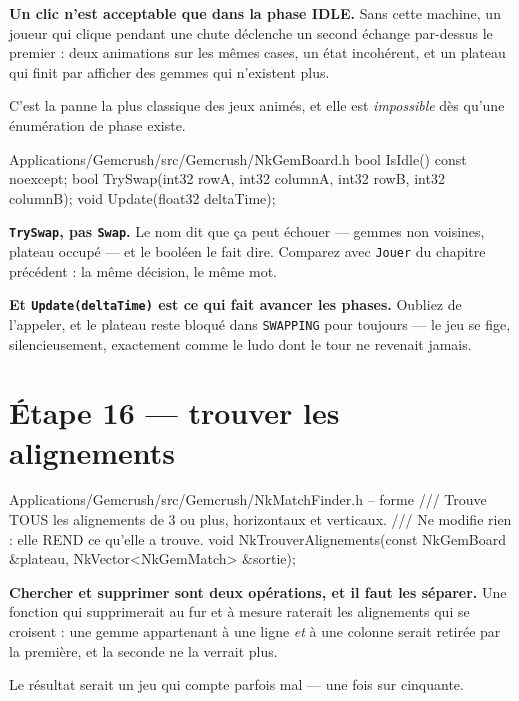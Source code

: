 \begin{nkretenir}
\textbf{Un clic n'est acceptable que dans la phase IDLE.} Sans cette machine, un
joueur qui clique pendant une chute déclenche un second échange par-dessus le
premier : deux animations sur les mêmes cases, un état incohérent, et un plateau
qui finit par afficher des gemmes qui n'existent plus.

C'est la panne la plus classique des jeux animés, et elle est \emph{impossible}
dès qu'une énumération de phase existe.
\end{nkretenir}

\begin{nkcode}{Applications/Gemcrush/src/Gemcrush/NkGemBoard.h}
bool IsIdle() const noexcept;
bool TrySwap(int32 rowA, int32 columnA, int32 rowB, int32 columnB);
void Update(float32 deltaTime);
\end{nkcode}

\begin{nkretenir}
\textbf{\texttt{TrySwap}, pas \texttt{Swap}.} Le nom dit que ça peut échouer ---
gemmes non voisines, plateau occupé --- et le booléen le fait dire. Comparez avec
\texttt{Jouer} du chapitre précédent : la même décision, le même mot.

\textbf{Et \texttt{Update(deltaTime)} est ce qui fait avancer les phases.}
Oubliez de l'appeler, et le plateau reste bloqué dans \texttt{SWAPPING} pour
toujours --- le jeu se fige, silencieusement, exactement comme le ludo dont le
tour ne revenait jamais.
\end{nkretenir}

\section{Étape 16 --- trouver les alignements}

\begin{nkcode}{Applications/Gemcrush/src/Gemcrush/NkMatchFinder.h -- forme}
/// Trouve TOUS les alignements de 3 ou plus, horizontaux et verticaux.
/// Ne modifie rien : elle REND ce qu'elle a trouve.
void NkTrouverAlignements(const NkGemBoard &plateau, NkVector<NkGemMatch> &sortie);
\end{nkcode}

\begin{nkretenir}
\textbf{Chercher et supprimer sont deux opérations, et il faut les séparer.} Une
fonction qui supprimerait au fur et à mesure raterait les alignements qui se
croisent : une gemme appartenant à une ligne \emph{et} à une colonne serait
retirée par la première, et la seconde ne la verrait plus.

Le résultat serait un jeu qui compte parfois mal --- une fois sur cinquante.
\end{nkretenir}

